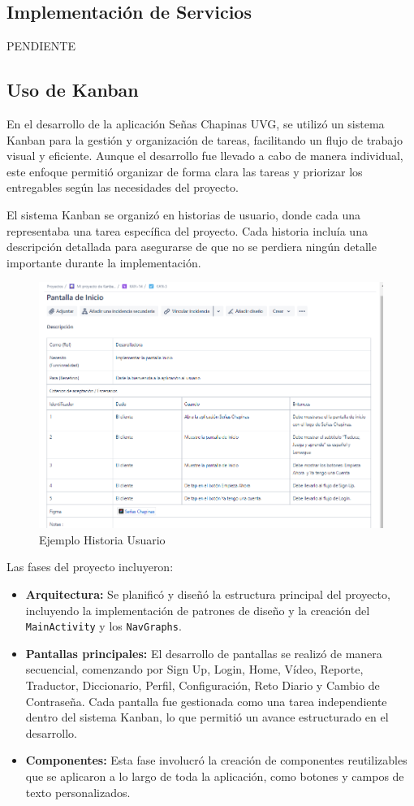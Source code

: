 
\subsection{Implementación de Servicios}
PENDIENTE


\subsection{Uso de Kanban}

En el desarrollo de la aplicación Señas Chapinas UVG, se utilizó un sistema Kanban para la gestión y organización de tareas, facilitando un flujo de trabajo visual y eficiente. Aunque el desarrollo fue llevado a cabo de manera individual, este enfoque permitió organizar de forma clara las tareas y priorizar los entregables según las necesidades del proyecto.

El sistema Kanban se organizó en historias de usuario, donde cada una representaba una tarea específica del proyecto. Cada historia incluía una descripción detallada para asegurarse de que no se perdiera ningún detalle importante durante la implementación.

\begin{figure}  [H]
    \centering
    \includegraphics[width=0.6\linewidth]{figuras/kabana_ejemplo.png}
    \caption{Ejemplo Historia Usuario}
    \label{fig:enter-label}
\end{figure}


Las fases del proyecto incluyeron:

\begin{itemize}
    \item \textbf{Arquitectura:} Se planificó y diseñó la estructura principal del proyecto, incluyendo la implementación de patrones de diseño y la creación del \texttt{MainActivity} y los \texttt{NavGraphs}.
    \item \textbf{Pantallas principales:} El desarrollo de pantallas se realizó de manera secuencial, comenzando por Sign Up, Login, Home, Vídeo, Reporte, Traductor, Diccionario, Perfil, Configuración, Reto Diario y Cambio de Contraseña. Cada pantalla fue gestionada como una tarea independiente dentro del sistema Kanban, lo que permitió un avance estructurado en el desarrollo.
    \item \textbf{Componentes:} Esta fase involucró la creación de componentes reutilizables que se aplicaron a lo largo de toda la aplicación, como botones y campos de texto personalizados.
\end{itemize}

